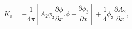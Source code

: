 \begin{equation}\label{topcharge} K_o=-\frac{1}{4\pi}\left[ A_2\phi_3\frac{\partial
\phi}{\partial x}.\phi +\frac{\partial \phi_3}{\partial x}\right]
+\frac{1}{4}\phi_3\frac{\partial A_2}{\partial x}, \end{equation}

